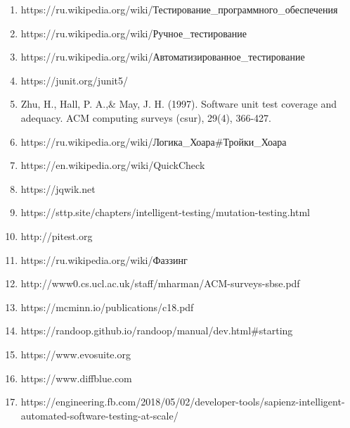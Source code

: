 \begin{enumerate}

\item https://ru.wikipedia.org/wiki/Тестирование\_программного\_обеспечения
	
\item https://ru.wikipedia.org/wiki/Ручное\_тестирование

\item https://ru.wikipedia.org/wiki/Автоматизированное\_тестирование

\item https://junit.org/junit5/

\item Zhu, H., Hall, P. A.,\& May, J. H. (1997). Software unit test coverage and adequacy. ACM computing surveys (csur), 29(4), 366-427.

\item https://ru.wikipedia.org/wiki/Логика\_Хоара#Тройки\_Хоара

\item https://en.wikipedia.org/wiki/QuickCheck

\item https://jqwik.net

\item https://sttp.site/chapters/intelligent-testing/mutation-testing.html

\item http://pitest.org

\item https://ru.wikipedia.org/wiki/Фаззинг

\item http://www0.cs.ucl.ac.uk/staff/mharman/ACM-surveys-sbse.pdf

\item https://mcminn.io/publications/c18.pdf

\item https://randoop.github.io/randoop/manual/dev.html#starting

\item https://www.evosuite.org

\item https://www.diffblue.com

\item https://engineering.fb.com/2018/05/02/developer-tools/sapienz-intelligent-automated-software-testing-at-scale/


\end{enumerate}


